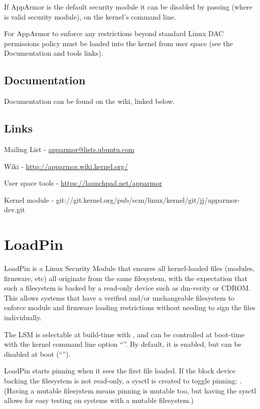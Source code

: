 \documentclass[a4paper,8pt,english]{sphinxmanual}
\begin{document}
If AppArmor is the default security module it can be disabled by passing
 (where  is valid security module), on the
kernel's command line.

For AppArmor to enforce any restrictions beyond standard Linux DAC permissions
policy must be loaded into the kernel from user space (see the Documentation
and tools links).


\subsection{Documentation}
\label{admin-guide/LSM/apparmor:documentation}
Documentation can be found on the wiki, linked below.


\subsection{Links}
\label{admin-guide/LSM/apparmor:links}
Mailing List - \href{mailto:apparmor@lists.ubuntu.com}{apparmor@lists.ubuntu.com}

Wiki - \href{http://apparmor.wiki.kernel.org/}{http://apparmor.wiki.kernel.org/}

User space tools - \href{https://launchpad.net/apparmor}{https://launchpad.net/apparmor}

Kernel module - git://git.kernel.org/pub/scm/linux/kernel/git/jj/apparmor-dev.git


\section{LoadPin}
\label{admin-guide/LSM/LoadPin::doc}\label{admin-guide/LSM/LoadPin:loadpin}
LoadPin is a Linux Security Module that ensures all kernel-loaded files
(modules, firmware, etc) all originate from the same filesystem, with
the expectation that such a filesystem is backed by a read-only device
such as dm-verity or CDROM. This allows systems that have a verified
and/or unchangeable filesystem to enforce module and firmware loading
restrictions without needing to sign the files individually.

The LSM is selectable at build-time with , and
can be controlled at boot-time with the kernel command line option
``''. By default, it is enabled, but can be disabled at
boot (``'').

LoadPin starts pinning when it sees the first file loaded. If the
block device backing the filesystem is not read-only, a sysctl is
created to toggle pinning: . (Having
a mutable filesystem means pinning is mutable too, but having the
sysctl allows for easy testing on systems with a mutable filesystem.)
\end{document}
